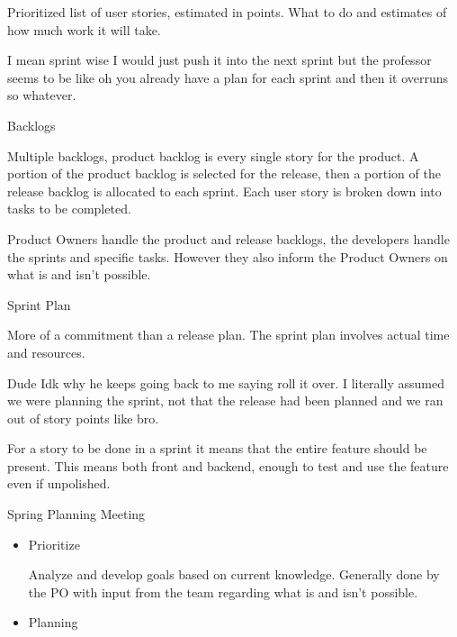 \documentclass{report}
\begin{document}
\begin{description}
        Prioritized list of user stories, estimated in points.
        What to do and estimates of how much work it will take.

        I mean sprint wise I would just push it into the next sprint
        but the professor seems to be like oh you already have a plan
        for each sprint and then it overruns so whatever.

    \item Backlogs

        Multiple backlogs, product backlog is every single story for the product.
        A portion of the product backlog is selected for the release, then a portion
        of the release backlog is allocated to each sprint. Each user story is broken
        down into tasks to be completed.

        Product Owners handle the product and release backlogs, the developers handle
        the sprints and specific tasks. However they also inform the Product Owners
        on what is and isn't possible.


    \item Sprint Plan

        More of a commitment than a release plan.
        The sprint plan involves actual time and resources.
        
        \begin{mdframed}
            Dude Idk why he keeps going back to
            me saying roll it over. I literally assumed
            we were planning the sprint, not that the
            release had been planned and we ran out of
            story points like bro.
        \end{mdframed}

        For a story to be done in a sprint it means that the
        entire feature should be present. This means both front
        and backend, enough to test and use the feature even if
        unpolished.

    \item Spring Planning Meeting

        \begin{itemize}
            \item Prioritize

                Analyze and develop goals based on current
                knowledge. Generally done by the PO with input
                from the team regarding what is and isn't possible.

            \item Planning


\end{itemize}
\end{description}
\end{document}
